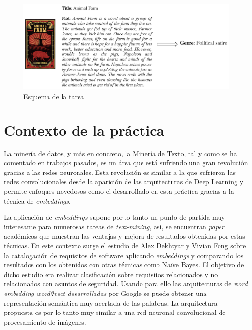 \documentclass[12pt,a4paper, xcolor=table]{article}
\begin{document}
\vspace{12mm}

  \begin{figure}[!h]
    \centering
    \includegraphics[width=450px]{img/Animal Farm.png}
    \caption{Esquema de la tarea}
    \end{figure}

\newpage

\section{Contexto de la práctica}
La minería de datos, y más en concreto, la Minería de Texto, tal y como se ha comentado en trabajos pasados\cite{pr2}, es un área que está sufriendo una gran revolución gracias a las redes neuronales. Esta revolución es similar a la que sufrieron las redes convolucionales desde la aparición de las arquitecturas de Deep Learning y permite enfoques novedosos como el desarrollado en esta práctica gracias a la técnica de \textit{embeddings}.

\vspace{3mm}

La aplicación de \textit{embeddings} supone por lo tanto un punto de partida muy interesante para numerosas tareas de \textit{text-mining}, así, se encuentran \textit{paper} académicos que muestran las ventajas y mejora de resultados obtenidas por estas técnicas. En este contexto surge el estudio de Alex Dekhtyar y Vivian Fong sobre la catalogación de requisitos de software aplicando \textit{embeddings} y comparando los resultados con los obtenidos con otras técnicas como Naïve Bayes\cite{naive}. El objetivo de dicho estudio era realizar clasificación sobre requisitos relacionados y no relacionados con asuntos de seguridad. Usando para ello las arquitecturas de \textit{word embedding} \textit{word2vect desarrolladas} por Google\cite{google} se puede obtener una representación semántica muy acertada de las palabras. La arquitectura propuesta es por lo tanto muy similar a una red neuronal convolucional de procesamiento de imágenes.
\end{document}
